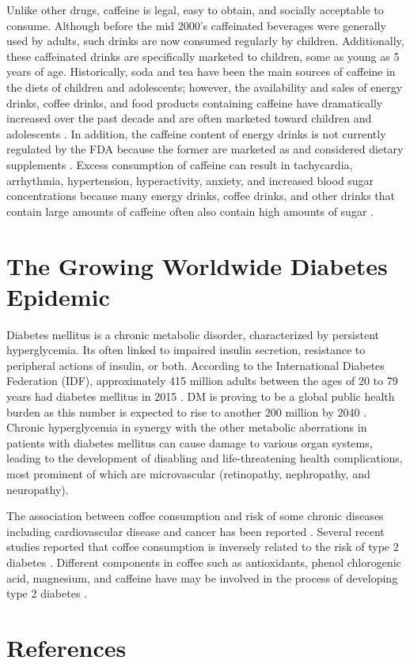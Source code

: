 \documentclass{scrartcl}
\begin{document}
Unlike other drugs, caffeine is legal, easy to obtain, and socially acceptable to consume. Although before the mid 2000's caffeinated beverages were generally used by adults, such drinks are now consumed regularly by children. Additionally, these caffeinated drinks are specifically marketed to children, some as young as 5 years of age. Historically, soda and tea have been the main sources of caffeine in the diets of children and adolescents; however, the availability and sales of energy drinks, coffee drinks, and food products containing caffeine have dramatically increased over the past decade and are often marketed toward children and adolescents \autocite{heckman2010energy}. In addition, the caffeine content of energy drinks is not currently regulated by the FDA because the former are marketed as and considered dietary supplements \autocite{heckman2010energy}. Excess consumption of caffeine can result in tachycardia, arrhythmia, hypertension, hyperactivity, anxiety, and increased blood sugar concentrations because many energy drinks, coffee drinks, and other drinks that contain large amounts of caffeine often also contain high amounts of sugar \autocite{seifert2011health}.

\section*{The Growing Worldwide Diabetes Epidemic}
\label{sec:orgf39fe77}
Diabetes mellitus is a chronic metabolic disorder, characterized by persistent hyperglycemia. Its often linked to impaired insulin secretion, resistance to peripheral actions of insulin, or both. According to the International Diabetes Federation (IDF), approximately 415 million adults between the ages of 20 to 79 years had diabetes mellitus in 2015 \autocite{2017}. DM is proving to be a global public health burden as this number is expected to rise to another 200 million by 2040 \autocite{2017}. Chronic hyperglycemia in synergy with the other metabolic aberrations in patients with diabetes mellitus can cause damage to various organ systems, leading to the development of disabling and life-threatening health complications, most prominent of which are microvascular (retinopathy, nephropathy, and neuropathy).

The association between coffee consumption and risk of some chronic diseases including cardiovascular disease and cancer has been reported \autocite{van2008coffee}. Several recent studies reported that coffee consumption is inversely related to the risk of type 2 diabetes \autocite{tuomilehto2004coffee}. Different components in coffee such as antioxidants, phenol chlorogenic acid, magnesium, and caffeine have may be involved in the process of developing type 2 diabetes \autocite{van2008coffee}.

\section*{References}
\label{sec:org39e956d}
\printbibliography
\end{document}
